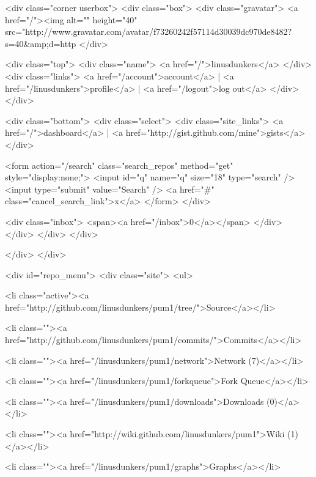   <div class="corner userbox">
    <div class="box">
      <div class="gravatar">
        <a href="/"><img alt="" height="40" src="http://www.gravatar.com/avatar/f73260242f57114d30039dc970de8482?s=40&amp;d=http%
      </div>

      <div class="top">
        <div class="name">
          <a href="/">linusdunkers</a>
        </div>
        <div class="links">
          <a href="/account">account</a> |
          <a href="/linusdunkers">profile</a> |
          <a href="/logout">log out</a>
        </div>
      </div>

      <div class="bottom">
        <div class="select">
          <div class="site_links">
            <a href="/">dashboard</a> | <a href="http://gist.github.com/mine">gists</a>
          </div>

          <form action="/search" class="search_repos" method="get" style="display:none;">
          <input id="q" name="q" size="18" type="search" /> 
          <input type="submit" value="Search" />
          <a href="#" class="cancel_search_link">x</a>
          </form>
        </div>
        
        <div class="inbox"> <span><a href="/inbox">0</a></span> </div>
      </div>
    </div>
  </div>

          
        </div>
      </div>
      
      
        
  
  
    <div id="repo_menu">
      <div class="site">
        <ul>
          
            <li class="active"><a href="http://github.com/linusdunkers/pum1/tree/">Source</a></li>

            <li class=""><a href="http://github.com/linusdunkers/pum1/commits/">Commits</a></li>

            <li class=""><a href="/linusdunkers/pum1/network">Network (7)</a></li>

            
              <li class=""><a href="/linusdunkers/pum1/forkqueue">Fork Queue</a></li>
            

            <li class=""><a href="/linusdunkers/pum1/downloads">Downloads (0)</a></li>

            <li class=""><a href="http://wiki.github.com/linusdunkers/pum1">Wiki (1)</a></li>

            <li class=""><a href="/linusdunkers/pum1/graphs">Graphs</a></li>


